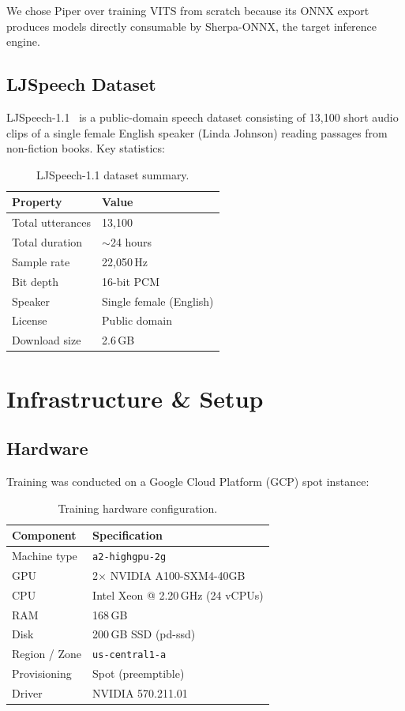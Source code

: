\documentclass[10pt,a4paper,twocolumn]{article}
\begin{document}
We chose Piper over training VITS from scratch because its ONNX export produces models directly consumable by Sherpa-ONNX, the target inference engine.

\subsection{LJSpeech Dataset}

LJSpeech-1.1~\cite{ljspeech17} is a public-domain speech dataset consisting of 13,100 short audio clips of a single female English speaker (Linda Johnson) reading passages from non-fiction books. Key statistics:

\begin{table}[ht]
\centering
\begin{tabular}{@{}ll@{}}
\toprule
Property & Value \\
\midrule
Total utterances & 13,100 \\
Total duration & $\sim$24 hours \\
Sample rate & 22,050\,Hz \\
Bit depth & 16-bit PCM \\
Speaker & Single female (English) \\
License & Public domain \\
Download size & 2.6\,GB \\
\bottomrule
\end{tabular}
\caption{LJSpeech-1.1 dataset summary.}
\label{tab:ljspeech}
\end{table}

\section{Infrastructure \& Setup}
\label{sec:infra}

\subsection{Hardware}

Training was conducted on a Google Cloud Platform (GCP) spot instance:

\begin{table}[ht]
\centering
\begin{tabular}{@{}ll@{}}
\toprule
Component & Specification \\
\midrule
Machine type & \texttt{a2-highgpu-2g} \\
GPU & 2$\times$ NVIDIA A100-SXM4-40GB \\
CPU & Intel Xeon @ 2.20\,GHz (24 vCPUs) \\
RAM & 168\,GB \\
Disk & 200\,GB SSD (pd-ssd) \\
Region / Zone & \texttt{us-central1-a} \\
Provisioning & Spot (preemptible) \\
Driver & NVIDIA 570.211.01 \\
\bottomrule
\end{tabular}
\caption{Training hardware configuration.}
\label{tab:hardware}
\end{table}
\end{document}
